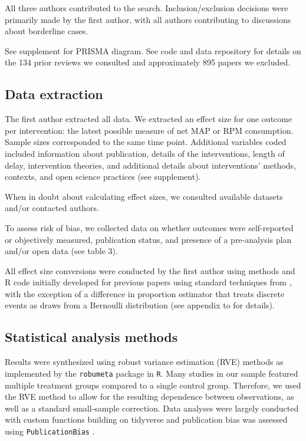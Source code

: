 \documentclass[sn-nature,referee,pdflatex]{sn-jnl}
\begin{document}
All three authors contributed to the search. Inclusion/exclusion
decisions were primarily made by the first author, with all authors
contributing to discussions about borderline cases.

See supplement for PRISMA diagram. See code and data repository for
details on the 134 prior reviews we consulted and approximately 895
papers we excluded.

\subsection{Data extraction}\label{sec3.3}

The first author extracted all data. We extracted an effect size for one
outcome per intervention: the latest possible measure of net MAP or RPM
consumption. Sample sizes corresponded to the same time point.
Additional variables coded included information about publication,
details of the interventions, length of delay, intervention theories,
and additional details about interventions' methods, contexts, and open
science practices (see supplement).

When in doubt about calculating effect sizes, we consulted available
datasets and/or contacted authors.

To assess risk of bias, we collected data on whether outcomes were
self-reported or objectively measured, publication status, and presence
of a pre-analysis plan and/or open data (see table 3).

All effect size conversions were conducted by the first author using
methods and R code initially developed for previous papers
\citep{paluck2019, paluck2021, porat2024} using standard techniques from
\citep{cooper2019}, with the exception of a difference in proportion
estimator that treats discrete events as draws from a Bernoulli
distribution (see appendix to \citep{paluck2021} for details).

\subsection{Statistical analysis methods}\label{sec3.4}

Results were synthesized using robust variance estimation (RVE) methods
\citep{hedges2010} as implemented by the \texttt{robumeta} package
\citep{fisher2015} in \texttt{R}\citep{Rlang}. Many studies in our
sample featured multiple treatment groups compared to a single control
group. Therefore, we used the RVE method to allow for the resulting
dependence between observations, as well as a standard small-sample
correction. Data analyses were largely conducted with custom functions
building on tidyverse \citep{wickham2019} and publication bias was
assessed using \texttt{PublicationBias} \citep{mathur2024, mathur2020}.
\end{document}
